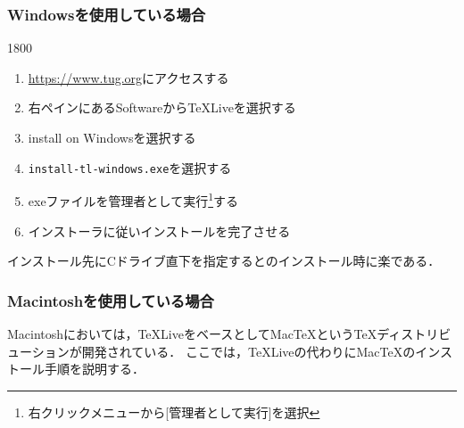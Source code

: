 \subsubsection{Windowsを使用している場合}
\begin{layer}{180}{0}
\end{layer}
\begin{enumerate}
    \item \url{https://www.tug.org}にアクセスする
    \item 右ペインにあるSoftwareからTeXLiveを選択する
    \item install on Windowsを選択する
    \item \verb|install-tl-windows.exe|を選択する
    \item exeファイルを管理者として実行\footnote{右クリックメニューから[管理者として実行]を選択}する
    \item インストーラに従いインストールを完了させる
\end{enumerate}
インストール先にCドライブ直下を指定すると{\ketcindy}のインストール時に楽である．

\subsubsection{Macintoshを使用している場合}
Macintoshにおいては，{\TeX}LiveをベースとしてMac{\TeX}という{\TeX}ディストリビューションが開発されている．
ここでは，{\TeX}Liveの代わりにMac{\TeX}のインストール手順を説明する．

